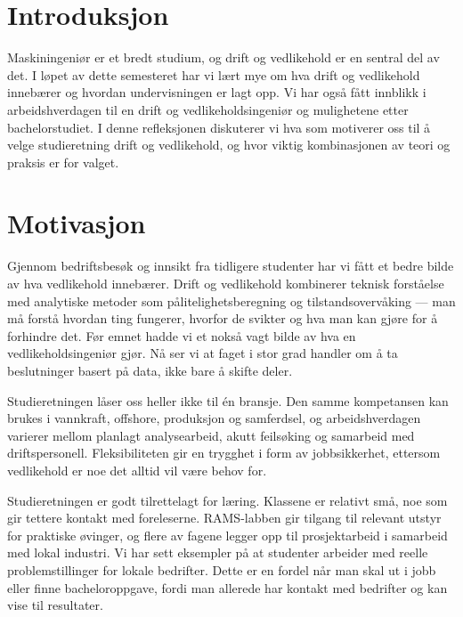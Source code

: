 \newpage
{}
\setcounter{section}{0}

\section*{Introduksjon}
Maskiningeniør er et bredt studium, og drift og vedlikehold er en sentral del av det. I løpet av dette semesteret har vi lært mye om hva drift og vedlikehold innebærer og hvordan undervisningen er lagt opp. Vi har også fått innblikk i arbeidshverdagen til en drift og vedlikeholdsingeniør og mulighetene etter bachelorstudiet. I denne refleksjonen diskuterer vi hva som motiverer oss til å velge studieretning drift og vedlikehold, og hvor viktig kombinasjonen av teori og praksis er for valget.

\section*{Motivasjon}

Gjennom bedriftsbesøk og innsikt fra tidligere studenter har vi fått et bedre bilde av hva vedlikehold innebærer. Drift og vedlikehold kombinerer teknisk forståelse med analytiske metoder som pålitelighetsberegning og tilstandsovervåking — man må forstå hvordan ting fungerer, hvorfor de svikter og hva man kan gjøre for å forhindre det. Før emnet hadde vi et nokså vagt bilde av hva en vedlikeholdsingeniør gjør. Nå ser vi at faget i stor grad handler om å ta beslutninger basert på data, ikke bare å skifte deler.

Studieretningen låser oss heller ikke til én bransje. Den samme kompetansen kan brukes i vannkraft, offshore, produksjon og samferdsel, og arbeidshverdagen varierer mellom planlagt analysearbeid, akutt feilsøking og samarbeid med driftspersonell. Fleksibiliteten gir en trygghet i form av jobbsikkerhet, ettersom vedlikehold er noe det alltid vil være behov for.

Studieretningen er godt tilrettelagt for læring. Klassene er relativt små, noe som gir tettere kontakt med foreleserne. RAMS-labben gir tilgang til relevant utstyr for praktiske øvinger, og flere av fagene legger opp til prosjektarbeid i samarbeid med lokal industri. Vi har sett eksempler på at studenter arbeider med reelle problemstillinger for lokale bedrifter. Dette er en fordel når man skal ut i jobb eller finne bacheloroppgave, fordi man allerede har kontakt med bedrifter og kan vise til resultater.

